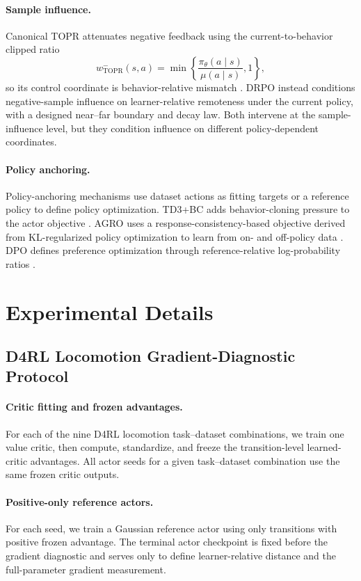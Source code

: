 \documentclass{article}
\theoremstyle{plain}
\theoremstyle{definition}
\theoremstyle{remark}
\begin{document}
\paragraph{Sample influence.}
Canonical TOPR attenuates negative feedback using the current-to-behavior
clipped ratio
\[
w^-_{\mathrm{TOPR}}(s,a)
=
\min\left\{
    \frac{\pi_\theta(a\mid s)}{\mu(a\mid s)},1
\right\},
\]
so its control coordinate is behavior-relative mismatch
\citep{leroux2025tapered}. DRPO instead conditions negative-sample influence
on learner-relative remoteness under the current policy, with a designed
near--far boundary and decay law. Both intervene at the sample-influence
level, but they condition influence on different policy-dependent
coordinates.

\paragraph{Policy anchoring.}
Policy-anchoring mechanisms use dataset actions as fitting targets or a
reference policy to define policy optimization. TD3+BC adds
behavior-cloning pressure to the actor objective
\citep{fujimoto2021minimalist}. AGRO uses a
response-consistency-based objective derived from KL-regularized policy
optimization to learn from on- and off-policy data
\citep{tang2026agro}. DPO defines preference optimization through
reference-relative log-probability ratios
\citep{rafailov2023direct}.

\section{Experimental Details}
\label{app:experimental_details}

\subsection{D4RL Locomotion Gradient-Diagnostic Protocol}
\label{app:d4rl_gradient_diagnostic}

\paragraph{Critic fitting and frozen advantages.}
For each of the nine D4RL locomotion task--dataset combinations, we train one
value critic, then compute, standardize, and freeze the transition-level
learned-critic advantages. All actor seeds for a given task--dataset combination
use the same frozen critic outputs.

\paragraph{Positive-only reference actors.}
For each seed, we train a Gaussian reference actor using only transitions with
positive frozen advantage. The terminal actor checkpoint is fixed before the
gradient diagnostic and serves only to define learner-relative distance and the
full-parameter gradient measurement.
\end{document}
